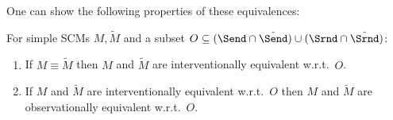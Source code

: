 One can show the following properties of these equivalences:
\begin{Prp}\label{prp:pearls_ladder_levels_1_and_2}
  For simple SCMs $M, \tilde{M}$ and a subset $O \subseteq (\Send \cap \tilde{\Send}) \cup (\Srnd \cap \tilde{\Srnd})$:
  \begin{enumerate}
    \item If $M \equiv \tilde{M}$ then $M$ and $\tilde{M}$ are interventionally equivalent w.r.t.\ $O$.
    \item If $M$ and $\tilde{M}$ are interventionally equivalent w.r.t.\ $O$ then 
      $M$ and $\tilde{M}$ are observationally equivalent w.r.t.\ $O$.
  \end{enumerate}
\end{Prp}


